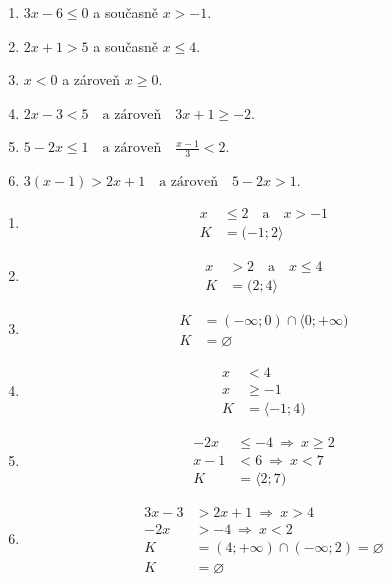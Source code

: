 \documentclass[11pt,a4paper]{article}
\begin{document}
\begin{zadaniReseniBox}[title={Domácí úkol}]
\begin{enumerate}[label=\alph*)]
\item
$3x-6\le0$ a současně $x>-1$.
\item
$2x+1>5$ a současně $x\le4$.
\item
$x<0$ a zároveň $x\ge0$.
\item
$2x-3<5\quad\text{a zároveň}\quad3x+1\ge-2$.
\item
$5-2x\le1\quad\text{a zároveň}\quad\frac{x-1}{3}<2$.
\item
$3(x-1)>2x+1\quad\text{a zároveň}\quad5-2x>1$.
\end{enumerate}
\tcblower
\begin{enumerate}[label=\alph*)]
\item
\[
\begin{aligned}
x&\le2\quad\text{a}\quad x>-1 \\[2mm]
K &= (-1;2\rangle
\end{aligned}
\]
\item
\[
\begin{aligned}
x&>2\quad\text{a}\quad x\le4 \\[2mm]
K &= (2;4\rangle
\end{aligned}
\]
\item
\[
\begin{aligned}
K&=(-\infty;0)\cap\langle0;+\infty) \\[2mm]
K &= \varnothing
\end{aligned}
\]
\item
\[
\begin{aligned}
x&<4\\x&\ge-1 \\[2mm]
K &= \langle-1;4)
\end{aligned}
\]
\item
\[
\begin{aligned}
-2x&\le-4\ \Rightarrow\ x\ge2\\x-1&<6\ \Rightarrow\ x<7 \\[2mm]
K &= \langle2;7)
\end{aligned}
\]
\item
\[
\begin{aligned}
3x-3&>2x+1\ \Rightarrow\ x>4\\-2x&>-4\ \Rightarrow\ x<2\\
K&=(4;+\infty)\cap(-\infty;2)=\varnothing \\[2mm]
K &= \varnothing
\end{aligned}
\]
\end{enumerate}
\end{zadaniReseniBox}
\end{document}
